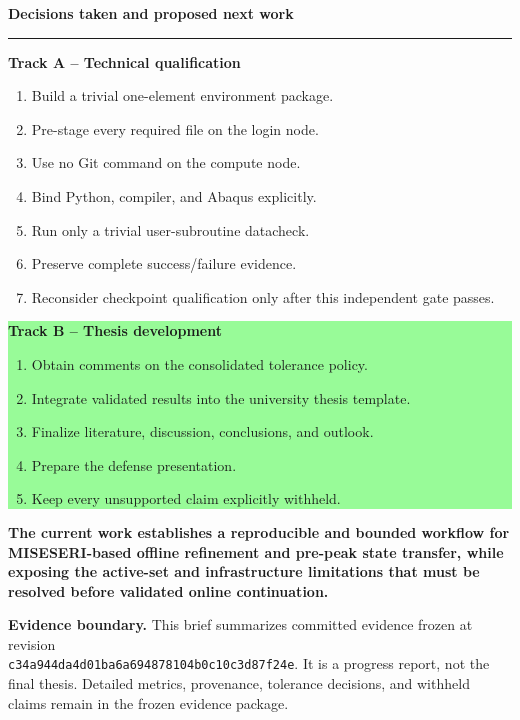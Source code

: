 \documentclass[11pt,a4paper]{article}
\newcommand{\boxx}[2]{\noindent\colorbox{#1}{\parbox{\dimexpr\linewidth-2\fboxsep}{#2}}}
\newcommand{\heading}[1]{{\color{navy}\LARGE\bfseries #1}\par\vspace{2mm}\color{blue}\rule{\linewidth}{1.2pt}\color{black}\vspace{2mm}}
\begin{document}
\clearpage
\heading{Decisions taken and proposed next work}
\begin{minipage}[t]{.48\linewidth}
\boxx{paleblue}{\textbf{\color{blue}Track A -- Technical qualification}\\
\begin{enumerate}
\item Build a trivial one-element environment package.
\item Pre-stage every required file on the login node.
\item Use no Git command on the compute node.
\item Bind Python, compiler, and Abaqus explicitly.
\item Run only a trivial user-subroutine datacheck.
\item Preserve complete success/failure evidence.
\item Reconsider checkpoint qualification only after this independent gate passes.
\end{enumerate}}
\end{minipage}\hfill
\begin{minipage}[t]{.48\linewidth}
\boxx{palegreen}{\textbf{\color{green}Track B -- Thesis development}\\
\begin{enumerate}
\item Obtain comments on the consolidated tolerance policy.
\item Integrate validated results into the university thesis template.
\item Finalize literature, discussion, conclusions, and outlook.
\item Prepare the defense presentation.
\item Keep every unsupported claim explicitly withheld.
\end{enumerate}}
\end{minipage}

\vspace{6mm}
\boxx{paleamber}{\Large\bfseries The current work establishes a reproducible and bounded workflow for MISESERI-based offline refinement and pre-peak state transfer, while exposing the active-set and infrastructure limitations that must be resolved before validated online continuation.}

\vfill
\small\textbf{Evidence boundary.} This brief summarizes committed evidence frozen at revision\\
\texttt{c34a944da4d01ba6a694878104b0c10c3d87f24e}. It is a progress report, not the final thesis. Detailed metrics, provenance, tolerance decisions, and withheld claims remain in the frozen evidence package.
\end{document}
